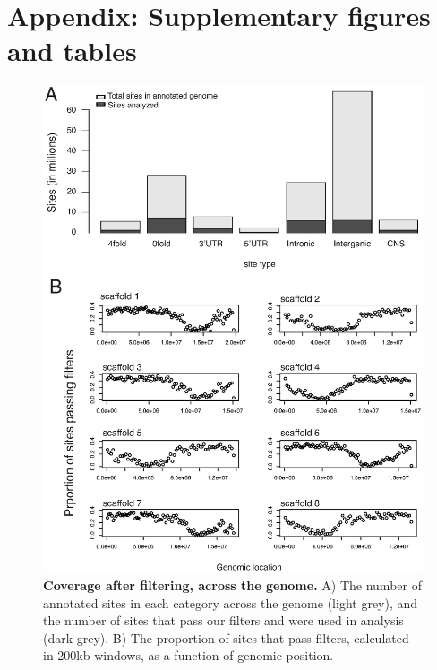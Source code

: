 \section{Appendix: Supplementary figures and tables}

\begin{figure}[ht!]
      \centering
       \includegraphics[width=\linewidth]{Ch2FigS1}
    \caption{\textbf{Coverage after filtering, across the genome.} A) The number of annotated sites in each category across the genome (light grey), and the number of sites that pass our filters and were used in analysis (dark grey). B) The proportion of sites that pass filters, calculated in 200kb windows, as a function of genomic position.}
    \label{fig:figS1}
\end{figure}

